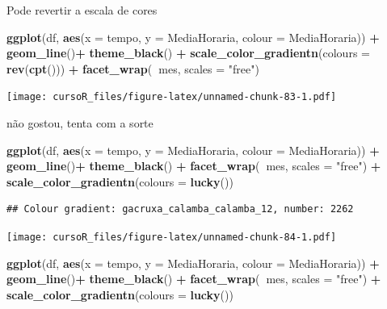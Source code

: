 \documentclass[]{book}
\newenvironment{Shaded}{\begin{snugshade}}{\end{snugshade}}
\newcommand{\KeywordTok}[1]{\textcolor[rgb]{0.13,0.29,0.53}{\textbf{#1}}}
\newcommand{\DataTypeTok}[1]{\textcolor[rgb]{0.13,0.29,0.53}{#1}}
\newcommand{\StringTok}[1]{\textcolor[rgb]{0.31,0.60,0.02}{#1}}
\newcommand{\OperatorTok}[1]{\textcolor[rgb]{0.81,0.36,0.00}{\textbf{#1}}}
\newcommand{\NormalTok}[1]{#1}
\begin{document}
Pode revertir a escala de cores

\begin{Shaded}
\begin{Highlighting}[]
\KeywordTok{ggplot}\NormalTok{(df, }\KeywordTok{aes}\NormalTok{(}\DataTypeTok{x =}\NormalTok{ tempo, }\DataTypeTok{y =}\NormalTok{ MediaHoraria, }\DataTypeTok{colour =}\NormalTok{ MediaHoraria)) }\OperatorTok{+}\StringTok{ }
\StringTok{  }\KeywordTok{geom_line}\NormalTok{()}\OperatorTok{+}
\StringTok{  }\KeywordTok{theme_black}\NormalTok{() }\OperatorTok{+}
\StringTok{  }\KeywordTok{scale_color_gradientn}\NormalTok{(}\DataTypeTok{colours =} \KeywordTok{rev}\NormalTok{(}\KeywordTok{cpt}\NormalTok{())) }\OperatorTok{+}\StringTok{ }
\StringTok{  }\KeywordTok{facet_wrap}\NormalTok{(}\OperatorTok{~}\NormalTok{mes, }\DataTypeTok{scales =} \StringTok{"free"}\NormalTok{)}
\end{Highlighting}
\end{Shaded}

\texttt{[image: cursoR\_files/figure-latex/unnamed-chunk-83-1.pdf]}

não gostou, tenta com a sorte

\begin{Shaded}
\begin{Highlighting}[]
\KeywordTok{ggplot}\NormalTok{(df, }\KeywordTok{aes}\NormalTok{(}\DataTypeTok{x =}\NormalTok{ tempo, }\DataTypeTok{y =}\NormalTok{ MediaHoraria, }\DataTypeTok{colour =}\NormalTok{ MediaHoraria)) }\OperatorTok{+}\StringTok{ }
\StringTok{  }\KeywordTok{geom_line}\NormalTok{()}\OperatorTok{+}
\StringTok{  }\KeywordTok{theme_black}\NormalTok{() }\OperatorTok{+}
\StringTok{    }\KeywordTok{facet_wrap}\NormalTok{(}\OperatorTok{~}\NormalTok{mes, }\DataTypeTok{scales =} \StringTok{"free"}\NormalTok{) }\OperatorTok{+}
\StringTok{  }\KeywordTok{scale_color_gradientn}\NormalTok{(}\DataTypeTok{colours =} \KeywordTok{lucky}\NormalTok{())}
\end{Highlighting}
\end{Shaded}

\begin{verbatim}
## Colour gradient: gacruxa_calamba_calamba_12, number: 2262
\end{verbatim}

\texttt{[image: cursoR\_files/figure-latex/unnamed-chunk-84-1.pdf]}

\begin{Shaded}
\begin{Highlighting}[]
\KeywordTok{ggplot}\NormalTok{(df, }\KeywordTok{aes}\NormalTok{(}\DataTypeTok{x =}\NormalTok{ tempo, }\DataTypeTok{y =}\NormalTok{ MediaHoraria, }\DataTypeTok{colour =}\NormalTok{ MediaHoraria)) }\OperatorTok{+}\StringTok{ }
\StringTok{  }\KeywordTok{geom_line}\NormalTok{()}\OperatorTok{+}
\StringTok{  }\KeywordTok{theme_black}\NormalTok{() }\OperatorTok{+}
\StringTok{    }\KeywordTok{facet_wrap}\NormalTok{(}\OperatorTok{~}\NormalTok{mes, }\DataTypeTok{scales =} \StringTok{"free"}\NormalTok{) }\OperatorTok{+}
\StringTok{  }\KeywordTok{scale_color_gradientn}\NormalTok{(}\DataTypeTok{colours =} \KeywordTok{lucky}\NormalTok{())}
\end{Highlighting}
\end{Shaded}
\end{document}
